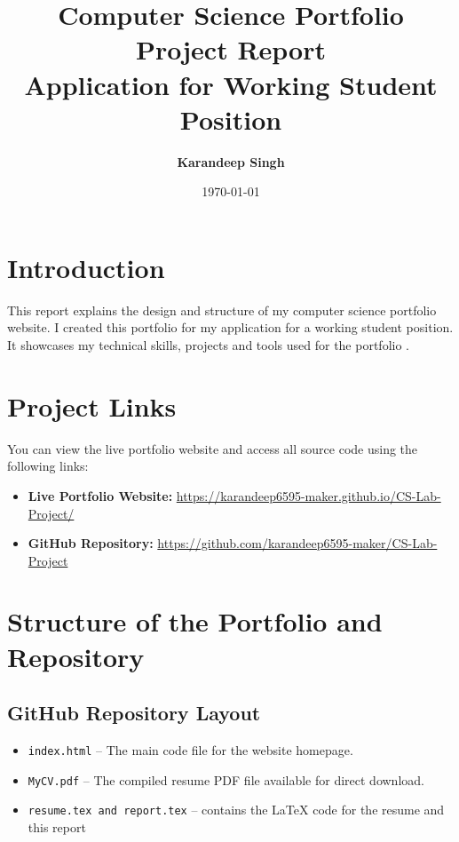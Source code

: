 \documentclass[11pt,a4paper]{article}
\title{\textbf{Computer Science Portfolio Project Report}\\
\large Application for Working Student Position}
\author{\textbf{Karandeep Singh}}
\date{\today}
\begin{document}
\maketitle

\section{Introduction}
This report explains the design and structure of my computer science portfolio website. I created this portfolio for my application for a working student position. It showcases my technical skills, projects and tools used for the portfolio .

\section{Project Links}
You can view the live portfolio website and access all source code using the following links:
\begin{itemize}
    \item \textbf{Live Portfolio Website:} \url{https://karandeep6595-maker.github.io/CS-Lab-Project/}
    \item \textbf{GitHub Repository:} \url{https://github.com/karandeep6595-maker/CS-Lab-Project}
\end{itemize}

\section{Structure of the Portfolio and Repository}

\subsection{GitHub Repository Layout}

\begin{itemize}
    \item \texttt{index.html} -- The main code file for the website homepage.
    \item \texttt{MyCV.pdf} -- The compiled resume PDF file available for direct download.
    \item \texttt{resume.tex and report.tex} -- contains the LaTeX code for the resume and this report 
\end{itemize}
\end{document}
